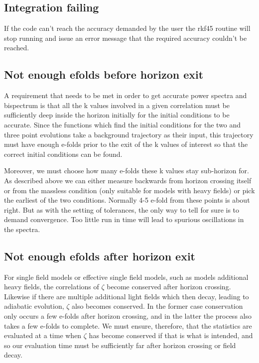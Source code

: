 \documentclass[10pt,
amsmath,amssymb,
aps,prd,nofootinbib,eqsecnum,a4paper]{revtex4}
\begin{document}
\subsection{Integration failing}

If the code can't reach the accuracy demanded by the user the rkf45 routine will stop running and issue an error 
message that the required accuracy couldn't be reached. 

\subsection{Not enough efolds before horizon exit}

A requirement that needs to be met in order to get accurate power spectra and bispectrum is that all the k values 
involved in a given correlation must be sufficiently deep inside the horizon initially for the 
initial conditions to be accurate. Since the functions which find the initial conditions for the two and three point evolutions take a background 
trajectory as their input, this trajectory must have enough e-folds prior to the exit of the k values of 
interest so that the correct initial conditions can be found. 

Moreover, we must choose how many e-folds these k values stay sub-horizon for. As described above we can either 
measure backwards from horizon crossing itself or from the massless condition (only suitable for models with heavy fields) or pick 
the earliest of the two conditions. 
Normally 4-5 e-fold from these points is about right. But as with the 
setting of tolerances, the only way to tell for sure is to demand convergence. Too little run in 
time will lead to spurious oscillations in the spectra.

\subsection{Not enough efolds after horizon exit}

For single field models or effective single field models, such as models additional heavy fields, the correlations of 
$\zeta$ become conserved after horizon crossing. Likewise if there are multiple additional light 
fields which then decay, leading to 
adiabatic evolution, $\zeta$ also becomes conserved. In the former case conservation only 
occurs a few e-folds after 
horizon crossing, and in the latter the process also takes a few e-folds to complete. 
We must ensure, therefore, that the statistics are 
evaluated at a time when $\zeta$ has become conserved if that is what is intended, and so our evaluation time 
must be sufficiently far after horizon crossing or field decay.
\end{document}
